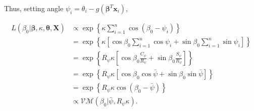 \documentclass[12pt,a4paper]{article}\usepackage[]{graphicx}\usepackage[]{color}
\begin{document}
Thus, setting angle $\psi_i = \theta_i - g(\boldsymbol\beta^T \boldsymbol{x}_i)$,


\begin{align*}
L(\beta_0 \vert \boldsymbol\beta, \kappa, \boldsymbol\theta, \boldsymbol{X}) & \propto \exp \left\lbrace \kappa \sum_{i=1}^n \cos ( \beta_0 - \psi_i)  \right\rbrace \\
& = \exp \left\lbrace \kappa   \left[ \cos\beta_0 \sum_{i=1}^n \cos\psi_i +  \sin\beta_0 \sum_{i=1}^n \sin\psi_i \right]  \right\rbrace \\
& = \exp \left\lbrace R_{\psi}  \kappa  \left[ \cos\beta_0 \frac{C_{\psi}}{R_{\psi}} +  \sin\beta_0 \frac{S_{\psi}}{R_{\psi}} \right]  \right\rbrace \\
& = \exp \left\lbrace R_{\psi} \kappa   \left[ \cos\beta_0 \cos{\bar\psi} +  \sin\beta_0 \sin{\bar\psi}\right]  \right\rbrace \\
& = \exp \left\lbrace R_{\psi} \kappa \cos \left( \beta_0 - \bar\psi \right)  \right\rbrace \\
& \propto \mathcal{VM}(\beta_0 \vert \bar\psi, R_{\psi} \kappa).
\end{align*}







\end{document}
